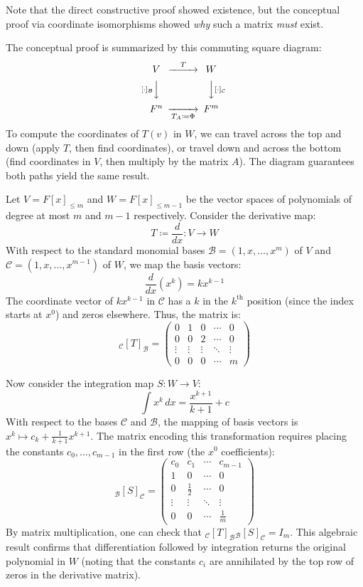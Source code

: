 \documentclass[../linear_algebra_and_groups.tex]{subfiles}
\begin{document}
Note that the direct constructive proof showed existence, but the conceptual proof via coordinate isomorphisms showed \textit{why} such a matrix \textit{must} exist.

\begin{remark}
    The conceptual proof is summarized by this commuting square diagram:
    \[
    \begin{CD}
    V @>T>> W \\
    @V{[\cdot]_\mathcal{B}}VV @VV{[\cdot]_\mathcal{C}}V \\
    F^n @>>T_A\coloneqq\Phi> F^m
    \end{CD}
    \]
    To compute the coordinates of $T(v)$ in $W$, we can travel across the top and down (apply $T$, then find coordinates), or travel down and across the bottom (find coordinates in $V$, then multiply by the matrix $A$). The diagram guarantees both paths yield the same result.
\end{remark}

\begin{example}
    Let $V=F[x]_{\le m}$ and $W=F[x]_{\le m-1}$ be the vector spaces of polynomials of degree at most $m$ and $m-1$ respectively. Consider the derivative map:
    \[ T \coloneqq \frac{d}{dx}:V\to W \]
    With respect to the standard monomial bases $\mathcal{B}=(1,x,\dots,x^m)$ of $V$ and $\mathcal{C}=(1,x,\dots,x^{m-1})$ of $W$, we map the basis vectors:
    \[ \frac{d}{dx}(x^k) = kx^{k-1} \]
    The coordinate vector of $kx^{k-1}$ in $\mathcal{C}$ has a $k$ in the $k^{\mathrm{th}}$ position (since the index starts at $x^0$) and zeros elsewhere. Thus, the matrix is:
    \[
    {}_\mathcal{C}[T]_\mathcal{B} = \begin{pmatrix} 0 & 1 & 0 & \cdots & 0 \\ 0 & 0 & 2 & \cdots & 0 \\ \vdots & \vdots & \vdots & \ddots & \vdots \\ 0 & 0 & 0 & \cdots & m \end{pmatrix}
    \]
    
    Now consider the integration map $S:W\to V$:
    \[ \int x^k\,dx = \frac{x^{k+1}}{k+1} + c \]
    With respect to the bases $\mathcal{C}$ and $\mathcal{B}$, the mapping of basis vectors is $x^k \mapsto c_k + \frac{1}{k+1}x^{k+1}$. The matrix encoding this transformation requires placing the constants $c_0, \dots, c_{m-1}$ in the first row (the $x^0$ coefficients):
    \[
    {}_\mathcal{B}[S]_\mathcal{C} = \begin{pmatrix} c_0 & c_1 & \cdots & c_{m-1} \\ 1 & 0 & \cdots & 0 \\ 0 & \frac{1}{2} & \cdots & 0 \\ \vdots & \vdots & \ddots & \vdots \\ 0 & 0 & \cdots & \frac{1}{m} \end{pmatrix}
    \]
    By matrix multiplication, one can check that ${}_\mathcal{C}[T]_\mathcal{B} {}_\mathcal{B}[S]_\mathcal{C} = I_m$. This algebraic result confirms that differentiation followed by integration returns the original polynomial in $W$ (noting that the constants $c_i$ are annihilated by the top row of zeros in the derivative matrix).
\end{example}
\end{document}
